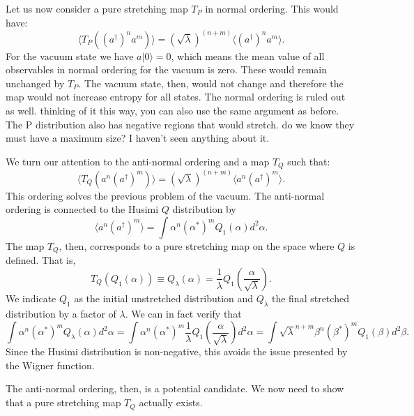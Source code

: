 \documentclass{article}
\begin{document}
Let us now consider a pure stretching map $T_P$ in normal ordering. This would have:
\begin{equation}
\langle T_P((a^\dagger)^n a^m) \rangle = (\sqrt{\lambda})^{(n+m)} \langle (a^\dagger)^n a^m \rangle.
\end{equation}
For the vacuum state we have $a|0\rangle=0$, which means the mean value of all observables in normal ordering for the vacuum is zero. These would remain unchanged by $T_P$. The vacuum state, then, would not change and therefore the map would not increase entropy for all states. The normal ordering is ruled out as well. {\color{blue} thinking of it this way, you can also use the same argument as before. The P distribution also has negative regions that would stretch.} {\color{red} do we know they must have a maximum size? I haven't seen anything about it.}

We turn our attention to the anti-normal ordering and a map $T_Q$ such that:
\begin{equation}
\langle T_Q(a^n(a^\dagger)^m) \rangle = (\sqrt{\lambda})^{(n+m)} \langle a^n(a^\dagger)^m \rangle.
\end{equation}
This ordering solves the previous problem of the vacuum. The anti-normal ordering is connected to the Husimi $Q$ distribution by
\begin{equation}
    \langle a^n (a^\dagger)^m\rangle=\int \alpha^n(\alpha^*)^m Q_1(\alpha)d^2\alpha.
\end{equation}
The map $T_Q$, then, corresponds to a pure stretching map on the space where $Q$ is defined. That is,
\begin{equation}
T_Q(Q_1(\alpha)) \equiv Q_\lambda(\alpha) = \frac{1}{\lambda}Q_1\left(\frac{\alpha}{\sqrt{\lambda}}\right).
\end{equation}
We indicate $Q_1$ as the initial unstretched distribution and $Q_\lambda$ the final stretched distribution by a factor of $\lambda$. We can in fact verify that 
\begin{equation}
\int \alpha^n(\alpha^*)^m Q_\lambda(\alpha)d^2\alpha=\int \alpha^n(\alpha^*)^m \frac{1}{\lambda}Q_1\left(\frac{\alpha}{\sqrt{\lambda}}\right)d^2\alpha=\int \sqrt{\lambda}^{n+m}\beta^n(\beta^*)^m Q_1(\beta)d^2\beta.
\end{equation}
Since the Husimi distribution is non-negative, this avoids the issue presented by the Wigner function.

The anti-normal ordering, then, is a potential candidate. We now need to show that a pure stretching map $T_Q$ actually exists.
\end{document}
